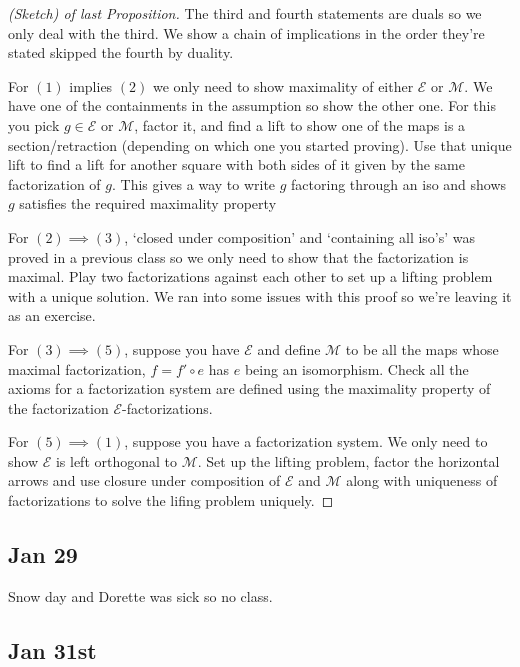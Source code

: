 \documentclass[11pt]{amsart}
\theoremstyle{plain}
\theoremstyle{definition}
\newcommand{\cE}{{\mathcal E}}
\newcommand{\cM}{{\mathcal M}}
\begin{document}
\begin{proof}[(Sketch) of last Proposition]
The third and fourth statements are duals so we only deal with the third. We show a chain of implications in the order they're stated skipped the fourth by duality. \bigskip

For $(1)$ implies $(2)$ we only need to show maximality of either $\cE$ or $\cM$. We have one of the containments in the assumption so show the other one. For this you pick $g \in \cE$ or $\cM$, factor it, and find a lift to show one of the maps is a section/retraction (depending on which one you started proving). Use that unique lift to find a lift for another square with both sides of it given by the same factorization of $g$. This gives a way to write $g$ factoring through an iso and shows $g$ satisfies the required maximality property \bigskip 

For $(2) \implies (3)$, `closed under composition' and `containing all iso's' was proved in a previous class so we only need to show that the factorization is maximal. Play two factorizations against each other to set up a lifting problem with a unique solution. We ran into some issues with this proof so we're leaving it as an exercise. \bigskip

For $(3) \implies (5)$, suppose you have $\cE$ and define $\cM$ to be all the maps whose maximal factorization, $f = f' \circ e$ has $e$ being an isomorphism. Check all the axioms for a factorization system are defined using the maximality property of the factorization $\cE$-factorizations. \bigskip

For $(5) \implies (1)$, suppose you have a factorization system. We only need to show $\cE$ is left orthogonal to $\cM$. Set up the lifting problem, factor the horizontal arrows and use closure under composition of $\cE$ and $\cM$ along with uniqueness of factorizations to solve the lifing problem uniquely. \bigskip


\end{proof}

\subsection{Jan 29}

Snow day and Dorette was sick so no class.

\subsection{Jan 31st}
\end{document}

